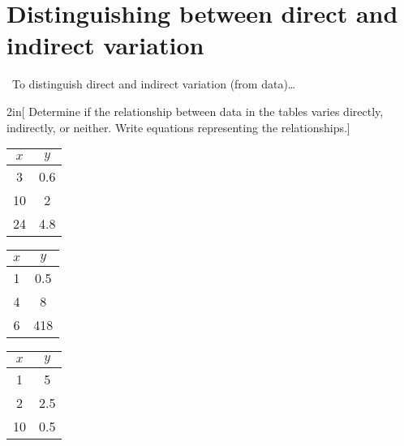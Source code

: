 \section{Distinguishing between direct and indirect variation}

\begin{myConceptSteps}{~To distinguish direct and indirect variation (from data)\dots}
\end{myConceptSteps}


\newpage
\begin{my2Problems}{2in}[%
    Determine if the relationship between data in the tables varies directly, indirectly, or neither.
    Write equations representing the relationships.]
    {
        \centering
        \begin{tabular}{c|c}
            $x$ & $y$ \\
            \hline\hline
            3 & 0.6 \\
            10 & 2 \\
            24 & 4.8 
        \end{tabular}
    }
    {
        \centering
        \begin{tabular}{c|c}
            $x$ & $y$ \\
            \hline\hline
            1 & 0.5 \\
            4 & 8 \\
            6 & 418 
        \end{tabular}
    }
\end{my2Problems}
\begin{myProblem}{2in}
    {
        \centering
        \begin{tabular}{c|c}
            $x$ & $y$ \\
            \hline\hline
            1 & 5 \\
            2 & 2.5 \\
            10 & 0.5 
        \end{tabular}
    }
\end{myProblem}
